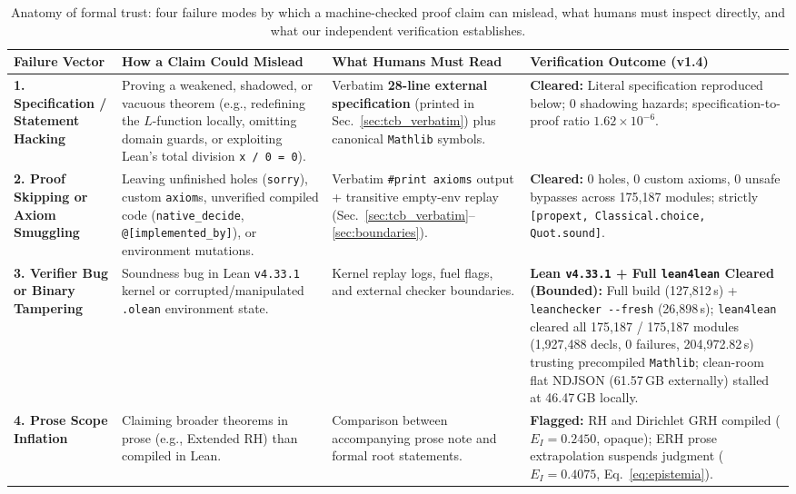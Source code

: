 \documentclass[11pt,a4paper]{article}
\begin{document}
\begin{table}[!htb]
\centering
\caption{Anatomy of formal trust: four failure modes by which a machine-checked proof claim can mislead, what humans must inspect directly, and what our independent verification establishes.}
\label{tab:trust_anatomy}
\footnotesize
\setlength{\tabcolsep}{4pt}
\begin{tabular}{@{}>{\raggedright\arraybackslash}p{}>{\raggedright\arraybackslash}p{}>{\raggedright\arraybackslash}p{}>{\raggedright\arraybackslash}p{}@{}}
\toprule
\textbf{Failure Vector} & \textbf{How a Claim Could Mislead} & \textbf{What Humans Must Read} & \textbf{Verification Outcome (v1.4)} \\
\midrule
\textbf{1. Specification / Statement Hacking} & Proving a weakened, shadowed, or vacuous theorem (e.g., redefining the $L$-function locally, omitting domain guards, or exploiting Lean's total division \texttt{x / 0 = 0}). & Verbatim \textbf{28-line external specification} (printed in Sec.~\ref{sec:tcb_verbatim}) plus canonical \texttt{Mathlib} symbols. & \textbf{Cleared:} Literal specification reproduced below; 0 shadowing hazards; specification-to-proof ratio $1.62 \times 10^{-6}$. \\
\addlinespace[4pt]
\textbf{2. Proof Skipping or Axiom Smuggling} & Leaving unfinished holes (\texttt{sorry}), custom \texttt{axiom}s, unverified compiled code (\texttt{native\_decide}, \texttt{@[implemented\_by]}), or environment mutations. & Verbatim \texttt{\#print axioms} output + transitive empty-env replay (Sec.~\ref{sec:tcb_verbatim}--\ref{sec:boundaries}). & \textbf{Cleared:} 0 holes, 0 custom axioms, 0 unsafe bypasses across 175,187 modules; strictly \texttt{[propext, Classical.choice, Quot.sound]}. \\
\addlinespace[4pt]
\textbf{3. Verifier Bug or Binary Tampering} & Soundness bug in Lean \texttt{v4.33.1} kernel or corrupted/manipulated \texttt{.olean} environment state. & Kernel replay logs, fuel flags, and external checker boundaries. & \textbf{Lean \texttt{v4.33.1} + Full \texttt{lean4lean} Cleared (Bounded):} Full build (127,812\,s) + \texttt{leanchecker -{}-fresh} (26,898\,s); \texttt{lean4lean} cleared all 175,187 / 175,187 modules (1,927,488 decls, 0 failures, 204,972.82\,s) trusting precompiled \texttt{Mathlib}; clean-room flat NDJSON (61.57\,GB externally) stalled at 46.47\,GB locally. \\
\addlinespace[4pt]
\textbf{4. Prose Scope Inflation} & Claiming broader theorems in prose (e.g., Extended RH) than compiled in Lean. & Comparison between accompanying prose note and formal root statements. & \textbf{Flagged:} RH and Dirichlet GRH compiled ($E_I = 0.2450$, opaque); ERH prose extrapolation suspends judgment ($E_I = 0.4075$, Eq.~\ref{eq:epistemia}). \\
\bottomrule
\end{tabular}
\end{table}
\end{document}
